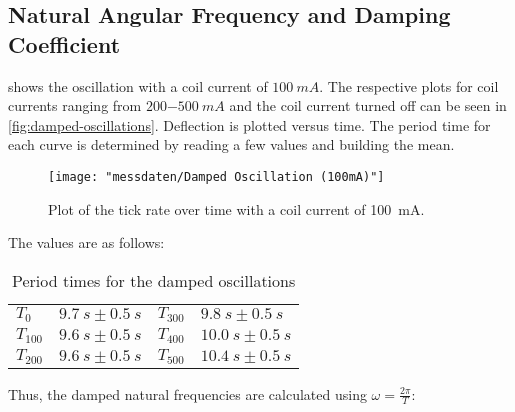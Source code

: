         \subsection{Natural Angular Frequency and Damping Coefficient}
             shows the oscillation with a coil current of \(\SI{100}{mA}\). The respective plots
            for coil currents ranging from \(\SI{200-500}{mA}\) and the coil current turned off can be seen in \cref{fig:damped-oscillations}.
            Deflection is plotted versus time. The period time for each curve is determined by reading a few values and building the mean.\par
            \begin{figure}[H]%
                \centering
                \texttt{[image: "messdaten/Damped Oscillation (100mA)"]}
                \caption[Course of the tick rate at \(I_{c}=\SI{100}{mA}\)]{Plot of the tick rate over time with a coil current of \SI{100}{mA}.}
                \label{fig:damped-oscillation-100mA}
            \end{figure}
            The values are as follows:\par
            \begin{table}[h]
                \centering
                \caption[Period times for the damped oscillations]{Period times for the damped oscillations}
                \begin{tabular}{@{}llll@{}}
                    \toprule
                    \( T_0 \)       &$\SI{9.7}{s} \pm \SI{0.5}{s}$    &\hspace{10mm}\(T_{300}\)      &$\SI{9.8}{s} \pm \SI{0.5}{s}$\\
                    \( T_{100} \)   &$\SI{9.6}{s} \pm \SI{0.5}{s}$    &\hspace{10mm}\(T_{400}\)      &$\SI{10.0}{s} \pm \SI{0.5}{s}$\\
                    \(T_{200}\)     &$\SI{9.6}{s} \pm \SI{0.5}{s}$    &\hspace{10mm}\(T_{500}\)      &$\SI{10.4}{s} \pm \SI{0.5}{s}$\\
                    \bottomrule
                \end{tabular}
                \label{tab:period_times_damped_oscillations}
            \end{table}
            Thus, the damped natural frequencies are calculated using \(\omega=\frac{2\pi}{T}\):\par

